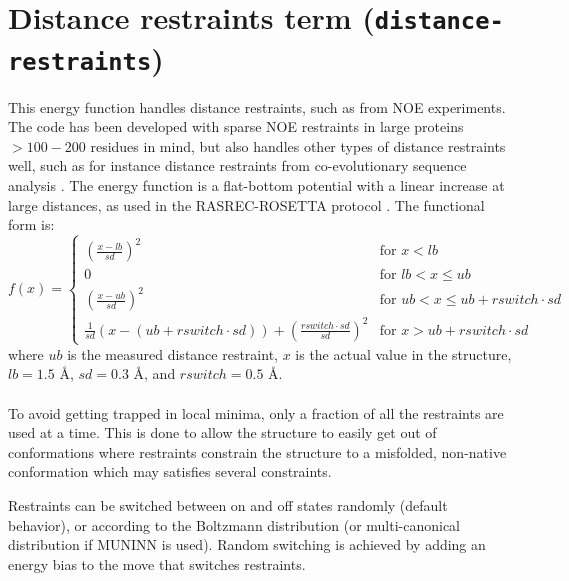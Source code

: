 \section{Distance restraints term (\texttt{distance-restraints})}
\label{sec:noe}

This energy function handles distance restraints, such as from NOE experiments.
The code has been developed with sparse NOE restraints in large proteins $> 100-200$ residues in mind, but also handles other types of distance restraints well, such as for instance distance restraints from co-evolutionary sequence analysis \cite{10.7287/peerj.preprints.374v1}.
The energy function is a flat-bottom potential with a linear increase at large distances, as used in the RASREC-ROSETTA protocol \cite{LangePNAS2012}.
The functional form is:
\begin{equation}
   f(x) =
\begin{cases}
\left( \frac{x-lb}{sd} \right)^2        & \text{for } x < lb \\
0                                       & \text{for } lb < x \leq ub \\
\left( \frac{x-ub}{sd} \right)^2        & \text{for } ub < x \leq ub + rswitch \cdot sd \\
\frac{1}{sd}\left(x - \left( ub + rswitch \cdot sd \right) \right) 
+ \left( \frac{rswitch \cdot sd }{sd} \right)^2
                                        & \text{for } x > ub + rswitch \cdot sd
\end{cases}
\end{equation}
where $ub$ is the measured distance restraint, $x$ is the actual value in the structure, 
$lb = 1.5$ \AA, $sd = 0.3$ \AA, and $rswitch = 0.5$ \AA.
\\\\To avoid getting trapped in local minima, only a fraction of all the restraints are used at a time.
This is done to allow the structure to easily get out of conformations where restraints constrain the structure to a misfolded, non-native conformation which may satisfies several constraints.

Restraints can be switched between on and off states randomly (default behavior), or according to the Boltzmann distribution (or multi-canonical distribution if MUNINN is used). Random switching is achieved by adding an energy bias to the move that switches restraints.

